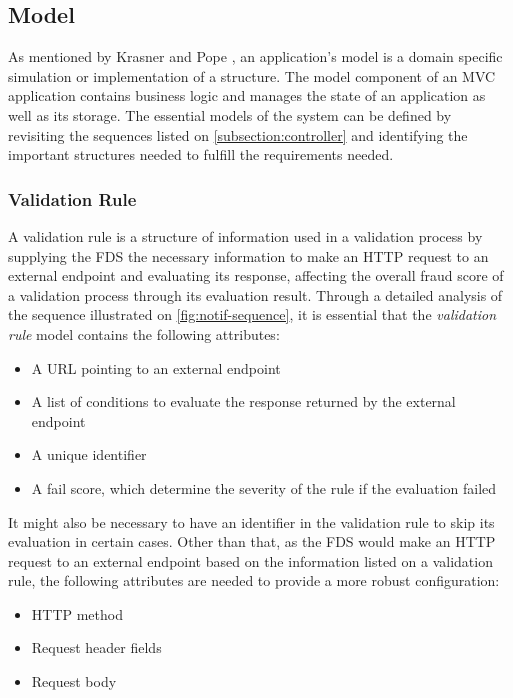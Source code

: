 \subsection{Model}
  \label{subsection:model}

  As mentioned by Krasner and Pope \autocite{krasner-pope-88}, an application's model is a domain specific simulation or implementation of a structure. The model component of an MVC application contains business logic and manages the state of an application as well as its storage. 
  The essential models of the system can be defined by revisiting the sequences listed on \autoref{subsection:controller} and identifying the important structures needed to fulfill the requirements needed.
  
  \subsubsection{Validation Rule}
    \label{subsub:rule}

    A validation rule is a structure of information used in a validation process by supplying the FDS the necessary information to make an HTTP request to an external endpoint and evaluating its response, affecting the overall fraud score of a validation process through its evaluation result. Through a detailed analysis of the sequence illustrated on \autoref{fig:notif-sequence}, it is essential that the \emph{validation rule} model contains the following attributes:

    \begin{itemize}
      \item A URL pointing to an external endpoint
      \item A list of conditions to evaluate the response returned by the external endpoint
      \item A unique identifier
      \item A fail score, which determine the severity of the rule if the evaluation failed
    \end{itemize}

    It might also be necessary to have an identifier in the validation rule to skip its evaluation in certain cases. Other than that, as the FDS would make an HTTP request to an external endpoint based on the information listed on a validation rule, the following attributes are needed to provide a more robust configuration:

    \begin{itemize}
      \item HTTP method 
      \item Request header fields
      \item Request body
    \end{itemize}


